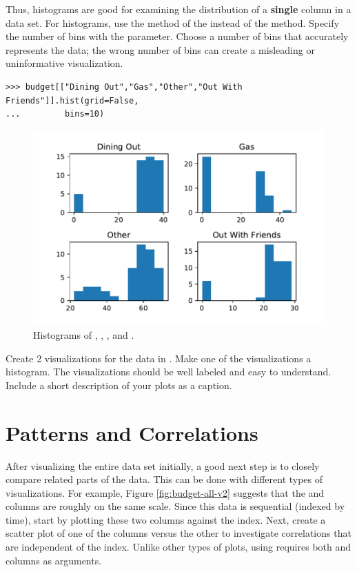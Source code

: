 Thus, histograms are good for examining the distribution of a \textbf{single} column in a data set.
For histograms, use the  method of the  instead of the  method.
Specify the number of bins with the  parameter.
Choose a number of bins that accurately represents the data; the wrong number of bins can create a misleading or uninformative visualization.


\begin{lstlisting}
>>> budget[["Dining Out","Gas","Other","Out With Friends"]].hist(grid=False, 
...			bins=10)
\end{lstlisting}

\begin{figure}[H]
    \includegraphics[width=.7\textwidth]{figures/hist_subplots.pdf}
   \caption{Histograms of , , , and .}
\end{figure}

\begin{problem}
Create 2 visualizations for the data in . 
Make one of the visualizations a histogram.
The visualizations should be well labeled and easy to understand.
Include a short description of your plots as a caption.
\label{prob:hist}
\end{problem}

\section*{Patterns and Correlations} %

After visualizing the entire data set initially, a good next step is to closely compare related parts of the data.
This can be done with different types of visualizations.
For example, Figure \ref{fig:budget-all-v2} suggests that the  and  columns are roughly on the same scale.
Since this data is sequential (indexed by time), start by plotting these two columns against the index.
Next, create a scatter plot of one of the columns versus the other to investigate correlations that are independent of the index.
Unlike other types of plots, using  requires both  and  columns as arguments.

